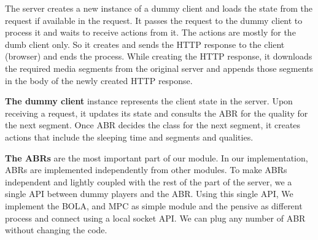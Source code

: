 The server creates a new instance of a dummy client and loads the state from the request if available in the request. It passes the request to the dummy client to process it and waits to receive actions from it. The actions are mostly for the dumb client only. So it creates and sends the HTTP response to the client (\ie browser) and ends the process. While creating the HTTP response, it downloads the required media segments from the original server and appends those segments in the body of the newly created HTTP response.

{\bf The dummy client} instance represents the client state in the server. Upon receiving a request, it updates its state and consults the ABR for the quality for the next segment. Once ABR decides the class for the next segment, it creates actions that include the sleeping time and segments and qualities.

{\bf The ABRs} are the most important part of our module. In our implementation, ABRs are implemented independently from other modules. To make ABRs independent and lightly coupled with the rest of the part of the server, we a single API between dummy players and the ABR.  Using this single API, We implement the BOLA, and MPC as simple \python module and the pensive as different process and connect using a local socket API. We can plug any number of ABR without changing the code.


